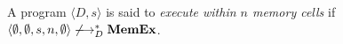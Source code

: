 \begin{myDef}
\label{df:ml} A program $\langle D, s \rangle$ is said to \emph{execute
within $n$ memory cells} if $\langle \emptyset, \emptyset, s, n,
\emptyset\rangle \not\xlongrightarrow{}_D^* \MEMEX$.
\end{myDef}




